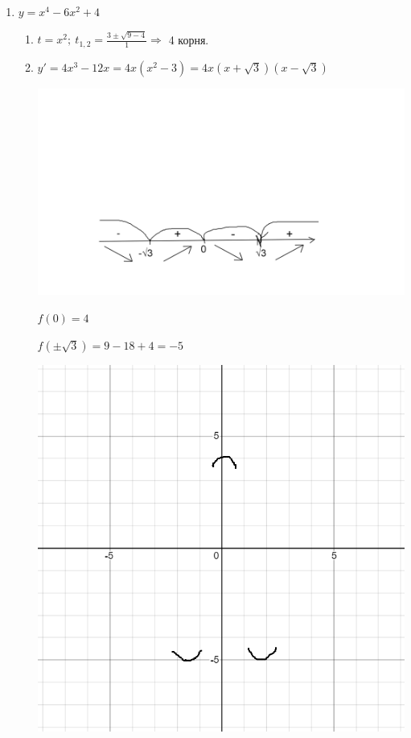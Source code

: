 \documentclass{article}
\begin{document}
\begin{enumerate}
    \item \( y = x^4 - 6x^2 + 4 \)

    \begin{enumerate}
        \item \( t = x^2;\ t_{1, 2} = \frac{3 \pm \sqrt{9 - 4}}{1} \Rightarrow \) 4 корня.
        \item \(y' = 4x^3-12x = 4x(x^2 - 3) = 4x(x + \sqrt{3})(x - \sqrt{3})\)
        
        \includegraphics[trim={10cm, 5cm, 0, 20cm}, scale=0.15]{11_1_11_3.png}

        \( f(0) = 4 \)

        \( f(\pm \sqrt{3}) = 9 - 18 + 4 = -5 \)
        
        \includegraphics[scale=0.3]{11_1_11_4.png}


\end{enumerate}
\end{enumerate}
\end{document}
